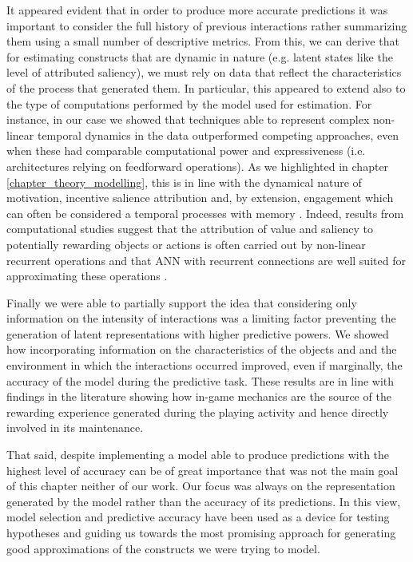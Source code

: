 It appeared evident that in order to produce more accurate predictions it was important to consider the full history of previous interactions rather summarizing them using a small number of descriptive metrics. From this, we can derive that for estimating constructs that are dynamic in nature (e.g. latent states like the level of attributed saliency), we must rely on data that reflect the characteristics of the process that generated them. In particular, this appeared to extend also to the type of computations performed by the model used for estimation. For instance, in our case we showed that techniques able to represent complex non-linear temporal dynamics in the data outperformed competing approaches, even when these had comparable computational power and expressiveness (i.e. architectures relying on feedforward operations). As we highlighted in chapter \ref{chapter_theory_modelling}, this is in line with the dynamical nature of motivation, incentive salience attribution and, by extension, engagement which can often be considered a temporal processes with memory \cite{toates1994comparing,robinson1993neural,zhang2009neural,tindell2009dynamic,berridge2012prediction}. Indeed, results from computational studies suggest that the attribution of value and saliency to potentially rewarding objects or actions is often carried out by non-linear recurrent operations \cite{song2017reward,wang2018prefrontal} and that ANN with recurrent connections are well suited for approximating these operations \cite{kietzmann2018deep}. 

Finally we were able to partially support the idea that considering only information on the intensity of interactions was a limiting factor preventing the generation of latent representations with higher predictive powers. We showed how incorporating information on the characteristics of the objects and and the environment in which the interactions occurred improved, even if marginally, the accuracy of the model during the predictive task. These results are in line with findings in the literature showing how in-game mechanics are the source of the rewarding experience generated during the playing activity \cite{westwood2010role,king2010role,king2010video,yannakakis2013player,phillips2013videogame} and hence directly involved in its maintenance. 

That said, despite implementing a model able to produce predictions with the highest level of accuracy can be of great importance that was not the main goal of this chapter neither of our work. Our focus was always on the representation generated by the model rather than the accuracy of its predictions. In this view, model selection and predictive accuracy have been used as a device for testing hypotheses and guiding us towards the most promising approach for generating good approximations of the constructs we were trying to model. 

